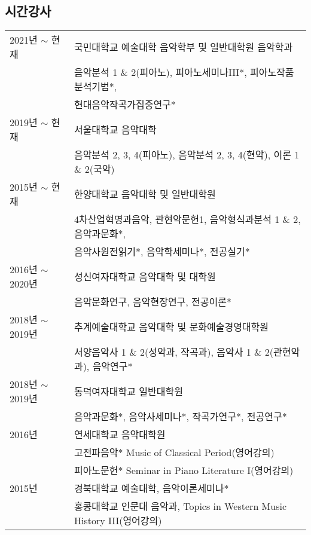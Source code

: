 \documentclass[a4paper,10pt,draft]{article}
\begin{document}
  \subsection*{\small 시간강사}
  \hspace*{-0.25cm}
  \begin{tabular}{p{3.0cm} p{11.0cm}}
    2021년 $\sim$ 현재 & 국민대학교 예술대학 음악학부 및 일반대학원 음악학과\\
    & 음악분석 1 \& 2(피아노), 피아노세미나III*, 피아노작품분석기법*,\\
    & 현대음악작곡가집중연구*\\[1mm]
    
    2019년 $\sim$ 현재 & 서울대학교 음악대학\\
    & 음악분석 2, 3, 4(피아노), 음악분석 2, 3, 4(현악), 이론 1 \& 2(국악)\\[1mm]
    
    2015년 $\sim$ 현재 & 한양대학교 음악대학 및 일반대학원\\
    & 4차산업혁명과음악, 관현악문헌1, 음악형식과분석 1 \& 2, 음악과문화*,\\
    & 음악사원전읽기*, 음악학세미나*, 전공실기*\\[1mm]
    
    2016년 $\sim$ 2020년 & 성신여자대학교 음악대학 및 대학원\\
    & 음악문화연구, 음악현장연구, 전공이론*\\[1mm]
    
    2018년 $\sim$ 2019년 & 추계예술대학교 음악대학 및 문화예술경영대학원\\
    & 서양음악사 1 \& 2(성악과, 작곡과), 음악사 1 \& 2(관현악과), 음악연구*\\[1mm]
    
    2018년 $\sim$ 2019년 & 동덕여자대학교 일반대학원\\
    & 음악과문화*, 음악사세미나*, 작곡가연구*, 전공연구*\\[1mm]
    
    2016년 & 연세대학교 음악대학원\\
    & 고전파음악* Music of Classical Period(영어강의)\\
    & 피아노문헌* Seminar in Piano Literature I(영어강의)\\[1mm]
    
    2015년 & 경북대학교 예술대학, 음악이론세미나*\\[1mm]
    & 홍콩대학교 인문대 음악과, Topics in Western Music History III(영어강의)\\
%    
%    
%    
  \end{tabular}
  
\end{document}
